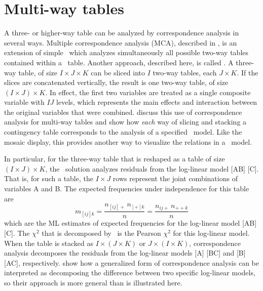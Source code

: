 \section{Multi-way tables}\label{sec:ca-multiway}

A three- or higher-way table can be analyzed by correspondence
analysis in several ways.
Multiple correspondence analysis (MCA), described in ,
is an extension of simple
\CA\ which analyzes simultaneously all possible two-way tables
contained within a \mway\ table.
Another approach, described here, is called 
.
A
three-way table, of size \(I \times  J \times  K\) can be sliced into
\(I\) two-way tables, each \(J \times  K\).  If the slices are
concatenated vertically, the result is one two-way table, of size \((
I \times  J ) \times  K\).  In effect, the first two variables are
treated as a single composite variable with \(IJ\) levels, which represents the main
effects and interaction between the original variables that were
combined.
discuss this use of
correspondence analysis for multi-way tables and show how \emph{each} way of
slicing and stacking a contingency table corresponds to the analysis
of a specified \loglin\ model.
Like the mosaic display, this provides another way to visualize the relations
in a \loglin\ model.

In particular, for the three-way table that is reshaped as a table of
size \(( I \times  J ) \times  K\), the \CA\
solution analyzes residuals from the log-linear model [AB] [C].  That
is, for such a table, the \(I \times  J\) rows represent the joint
combinations of variables A and B.  The expected frequencies under
independence for this table are
\begin{equation}\label{eq:mij-k}
  m_{[ij]k} = \frac{ n_{[ij]+} \,  n_{[+]k} }{n}
 = \frac{ n_{ij+} \,  n_{++k} }{n}
\end{equation}
which are the ML estimates of expected frequencies for the log-linear
model [AB] [C].  The \(\chi^2\) that is decomposed by \CA\ is the Pearson
\(\chi^2\) for this log-linear model.  When the table is stacked as
\(I \times  ( J \times  K )\) or \(J \times  ( I \times  K )\),
correspondence analysis decomposes the residuals from the log-linear
models [A] [BC] and [B] [AC], respectively.
show how a generalized form of correspondence analysis
can be interpreted as decomposing the difference between two specific
log-linear models, so their approach is more general than is illustrated
here.

